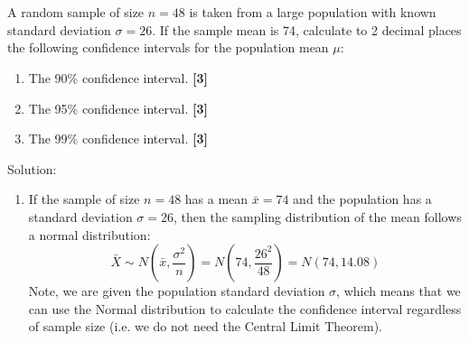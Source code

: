\documentclass[a4paper, leqno, 12pt]{article} %
\newenvironment{top_enumerate}{
\begin{enumerate}
  \setlength{\itemsep}{2em}
  \setlength{\topsep}{-0pt}
  \setlength{\partopsep}{-0pt}
}{\end{enumerate}}
\begin{document}
\section*{}

\begin{top_enumerate}

\item A random sample of size $n={48}$ is taken from a large population with known standard deviation $\sigma = {26}$. If the sample mean is {74}, calculate to 2 decimal places the following confidence intervals for the population mean $\mu$:
 
\setcounter{equation}{0}  %
\begin{enumerate}
	\setlength{\topsep}{-0pt}
	\setlength{\partopsep}{-0pt}
	\setlength{\itemsep}{10pt}
			\item The 90\% confidence interval.
	 \quad \textbf{[3]}
		\item The 95\% confidence interval.
	 \quad \textbf{[3]}
		\item The 99\% confidence interval.
	 \quad \textbf{[3]}
\end{enumerate}\addtocounter{enumi}{-1}
\item Solution:
 
\setcounter{equation}{0}  %
\begin{enumerate}
	\setlength{\topsep}{-0pt}
	\setlength{\partopsep}{-0pt}
	\setlength{\itemsep}{10pt}
			\item If the sample of size $n={48}$ has a mean $\bar x = {74}$ and the population has a standard deviation $\sigma={26}$, then the sampling distribution of the mean follows a normal distribution:
	\[
	\bar X \sim N \left(\bar x,\frac{\sigma^2}{n}\right) = N \left({74},\frac{{26}^2}{{48}}\right) = N \left({74},{14.08}\right)
	\]
	Note, we are given the population standard deviation $\sigma$, which means that we can use the Normal distribution to calculate the confidence interval regardless of sample size (i.e. we do not need the Central Limit Theorem).
	

\end{enumerate}
\end{top_enumerate}
\end{document}
